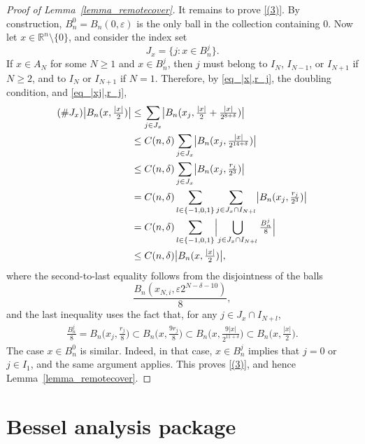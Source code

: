 \documentclass[12pt]{amsart}
\begin{document}
\begin{proof}[Proof of Lemma~\ref{lemma_remotecover}]
It remains to prove \eqref{(3)}. By construction, $B_n^0 = B_n(0,\varepsilon)$ is the only ball in the collection containing $0$. Now let $x\in \mathbb{R}^n \setminus \{0\}$, and consider the index set
\[
J_x = \{j: x\in B_n^j\}.
\]
If $x\in A_N$ for some $N\ge 1$ and $x\in B_n^j$, then $j$ must belong to $I_N$, $I_{N-1}$, or $I_{N+1}$ if $N\ge 2$, and to $I_N$ or $I_{N+1}$ if $N=1$. Therefore, by \eqref{eq_|x|,r_j}, the doubling condition, and \eqref{eq_|xj|,r_j},
\begin{align*}
    (\# J_x) \bigl|B_n (x,\tfrac{|x|}{2})\bigr|
    &\le \sum_{j \in J_x} \bigl|B_n( x_j, \tfrac{|x|}{2} + \tfrac{|x|}{2^{8+\delta}} )\bigr|\\
    &\le C(n,\delta) \sum_{j\in J_x} \bigl| B_n(x_j, \tfrac{|x|}{2^{14+\delta}} )\bigr|\\
    &\le C(n,\delta) \sum_{j \in J_x} \bigl| B_n(x_j, \tfrac{r_j}{2^{3}} )\bigr|\\
    &= C(n,\delta) \sum_{l\in \{-1,0,1\}} \sum_{j \in J_x \cap I_{N+l}} \bigl| B_n(x_j, \tfrac{r_j}{2^{3}} )\bigr| \\
    &= C(n,\delta) \sum_{l\in \{-1,0,1\}} \Bigl|\bigcup_{j \in J_x\cap I_{N+l}} \tfrac{B_n^j}{8} \Bigr|\\
    &\le C(n,\delta) \bigl|B_n (x,\tfrac{|x|}{2})\bigr|,
\end{align*}
where the second-to-last equality follows from the disjointness of the balls
\[
\frac{B_n( x_{N,i}, \varepsilon 2^{N-\delta-10} )}{8},
\]
and the last inequality uses the fact that, for any $j\in J_x \cap I_{N+l}$,
\begin{align*}
    \frac{B_n^j}{8} = B_n\bigl(x_j, \tfrac{r_j}{8} \bigr)
    \subset B_n \bigl(x,\tfrac{9r_j}{8} \bigr)
    \subset B_n\bigl(x, \tfrac{9 |x|}{2^{11+\delta}}\bigr)
    \subset B_n \bigl(x,\tfrac{|x|}{2}\bigr).
\end{align*}
The case $x\in B_n^0$ is similar. Indeed, in that case, $x\in B_n^j$ implies that $j=0$ or $j\in I_1$, and the same argument applies. This proves \eqref{(3)}, and hence Lemma~\ref{lemma_remotecover}.
\end{proof}






\section{Bessel analysis package}\label{app:B}
\end{document}
